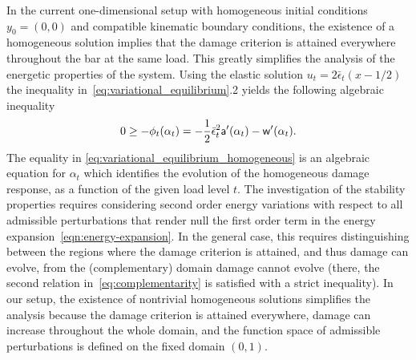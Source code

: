 In the current one-dimensional setup with homogeneous initial conditions $y_0=(0, 0)$ and compatible kinematic boundary conditions, the existence of a homogeneous solution implies that the damage criterion is attained everywhere throughout the bar at the same load. This greatly simplifies the analysis of the energetic properties of the system. 
Using the elastic solution $u_t = 2\bar \epsilon_t(x-1/2)$ 
 the inequality in~\eqref{eq:variational_equilibrium}.2 yields the following algebraic inequality
\begin{equation}
    \label{eq:variational_equilibrium_homogeneous}
    0 \geq -\phi_t(\alpha_t)= -\frac{1}{2}\bar \epsilon_t^2 \mathsf{a}'(\alpha_t)-\mathsf{w}'(\alpha_t).
\end{equation}
The equality in \eqref{eq:variational_equilibrium_homogeneous} is an algebraic equation for $\alpha_t$ which identifies the evolution of the homogeneous damage response, as a function of the given load level $t$.
The investigation of the stability properties requires  
considering second order energy variations with respect to all admissible perturbations that render null the first order term in the energy expansion~\eqref{eqn:energy-expansion}.
In the general case, this requires distinguishing between the regions where the damage criterion is attained, and thus damage can evolve, from the (complementary) domain damage cannot evolve (there, the second relation in~\eqref{eq:complementarity} is satisfied with a strict inequality).
In our setup, the existence of nontrivial homogeneous solutions simplifies the analysis because the damage criterion is attained everywhere, damage can increase throughout the whole domain, and the function space of admissible perturbations is defined on the fixed domain $(0, 1)$.



